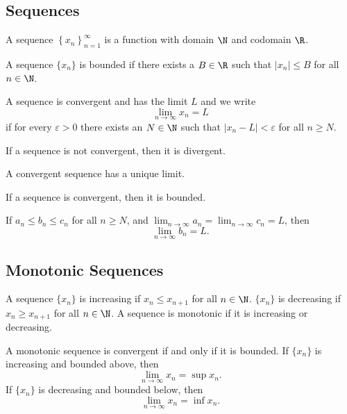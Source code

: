 \documentclass[12pt]{article}
\begin{document}
\subsection{Sequences}
\begin{definition}
    A sequence \(\left\{x_n\right\}_{n=1}^{\infty}\) is a function
    with domain \(\N\) and codomain \(\R\).
\end{definition}
\begin{definition}
    A sequence \(\{x_n\}\) is bounded if there exists a \(B\in\R\)
    such that \(|x_n|\leq B\) for all \(n\in\N\).
\end{definition}
\begin{definition}
    A sequence is convergent and has the limit \(L\) and we
    write
    \[\lim_{n\to\infty}x_n=L\]
    if for every \(\varepsilon>0\) there exists an \(N\in\N\) such that
    \(|x_n-L|<\varepsilon\) for all \(n\geq N\).
\end{definition}
If a sequence is not convergent, then it is divergent.
\begin{theorem}
    A convergent sequence has a unique limit.
\end{theorem}
\begin{theorem}
    If a sequence is convergent, then it is bounded.
\end{theorem}
\begin{theorem}
    If \(a_n\leq b_n\leq c_n\) for all \(n\geq N\), and
    \(\lim_{n\to\infty}a_n=\lim_{n\to\infty}c_n=L\), then
    \[\lim_{n\to\infty}b_n=L.\]
\end{theorem}

\subsection{Monotonic Sequences}
\begin{definition}
    A sequence \(\{x_n\}\) is increasing if \(x_n\leq x_{n+1}\) for
    all \(n\in\N\).
    \(\{x_n\}\) is decreasing if \(x_n\geq x_{n+1}\) for all
    \(n\in\N\).
    A sequence is monotonic if it is increasing or decreasing.
\end{definition}
\begin{theorem}
    A monotonic sequence is convergent if and only if it is bounded.
If \(\{x_n\}\) is increasing and bounded above, then
\[\lim_{n\to\infty}x_n=\sup x_n.\]
If \(\{x_n\}\) is decreasing and bounded below, then
\[\lim_{n\to\infty}x_n=\inf x_n.\]
\end{theorem}
\end{document}
